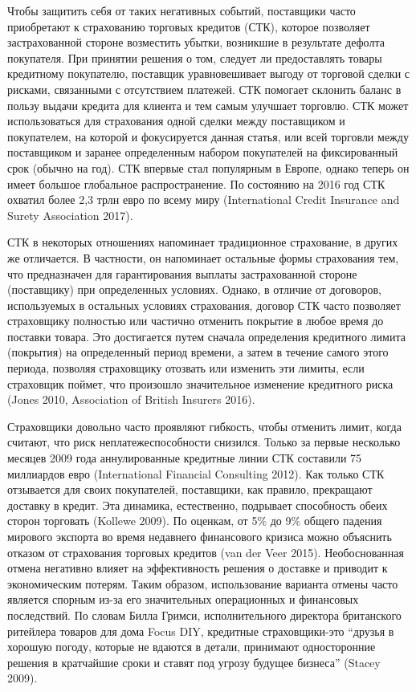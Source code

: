 \documentclass[a4paper,12pt]{article}
\begin{document}
Чтобы защитить себя от таких негативных событий, поставщики часто приобретают к страхованию торговых кредитов (СТК), которое позволяет застрахованной стороне возместить убытки, возникшие в результате дефолта покупателя. При принятии решения о том, следует ли предоставлять товары кредитному покупателю, поставщик уравновешивает выгоду от торговой сделки с рисками, связанными с отсутствием платежей. СТК помогает склонить баланс в пользу выдачи кредита для клиента и тем самым улучшает торговлю. СТК может использоваться для страхования одной сделки между поставщиком и покупателем, на которой и фокусируется данная статья, или всей торговли между поставщиком и заранее определенным набором покупателей на фиксированный срок (обычно на год). СТК впервые стал популярным в Европе, однако теперь он имеет большое глобальное распространение. По состоянию на 2016 год СТК охватил более 2,3 трлн евро по всему миру (International Credit Insurance and Surety Association 2017).


СТК в некоторых отношениях напоминает традиционное страхование, в других же отличается. В частности, он напоминает остальные формы страхования тем, что предназначен для гарантирования выплаты застрахованной стороне (поставщику) при определенных условиях. Однако, в отличие от договоров, используемых в остальных условиях страхования, договор СТК часто позволяет страховщику полностью или частично отменить покрытие в любое время до поставки товара. Это достигается путем сначала определения кредитного лимита (покрытия) на определенный период времени, а затем в течение самого этого периода, позволяя страховщику отозвать или изменить эти лимиты, если страховщик поймет, что произошло значительное изменение кредитного риска (Jones 2010, Association of British Insurers 2016).

Страховщики довольно часто проявляют гибкость, чтобы отменить лимит, когда считают, что риск неплатежеспособности снизился. Только за первые несколько месяцев 2009 года аннулированные кредитные линии СТК составили 75 миллиардов евро (International Financial Consulting 2012). Как только СТК отзывается для своих покупателей, поставщики, как правило, прекращают доставку в кредит. Эта динамика, естественно, подрывает способность обеих сторон торговать (Kollewe 2009). По оценкам, от 5\% до 9\% общего падения мирового экспорта во время недавнего финансового кризиса можно объяснить отказом от страхования торговых кредитов (van der Veer 2015). Необоснованная отмена негативно влияет на эффективность решения о доставке и приводит к экономическим потерям. Таким образом, использование варианта отмены часто является спорным из-за его значительных операционных и финансовых последствий. По словам Билла Гримси, исполнительного директора британского ритейлера товаров для дома Focus DIY, кредитные страховщики-это “друзья в хорошую погоду, которые не вдаются в детали, принимают односторонние решения в кратчайшие сроки и ставят под угрозу будущее бизнеса” (Stacey 2009).
\end{document}
